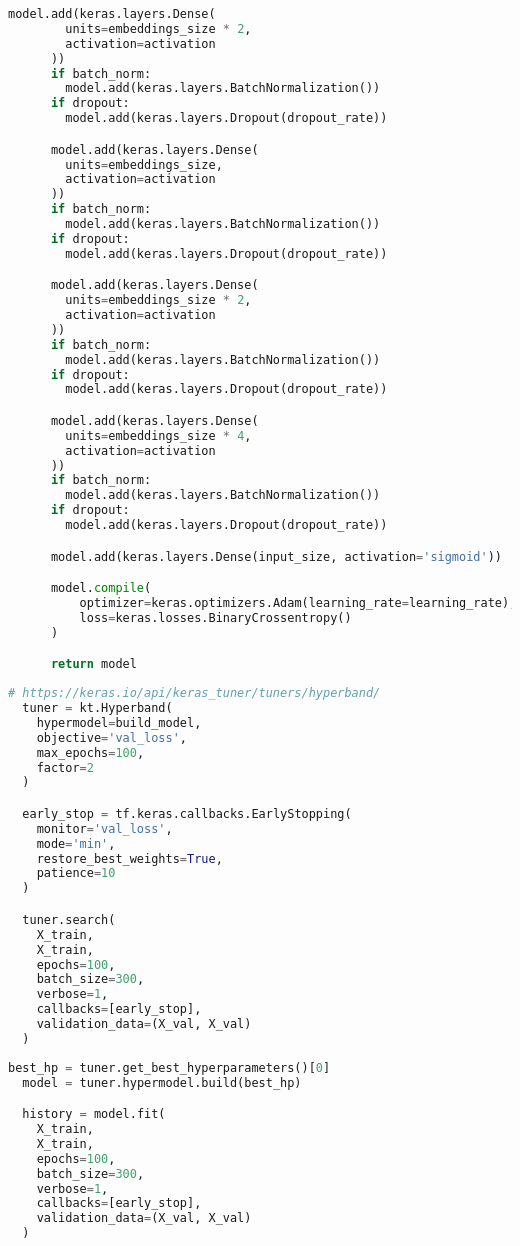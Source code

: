 \begin{lstlisting}[language=Python, caption=Keras and Keras Tuner snippet for model training and hyperparameter tuning]
      model.add(keras.layers.Dense(
        units=embeddings_size * 2,
        activation=activation
      ))
      if batch_norm:
        model.add(keras.layers.BatchNormalization())
      if dropout:
        model.add(keras.layers.Dropout(dropout_rate))

      model.add(keras.layers.Dense(
        units=embeddings_size,
        activation=activation
      ))
      if batch_norm:
        model.add(keras.layers.BatchNormalization())
      if dropout:
        model.add(keras.layers.Dropout(dropout_rate))

      model.add(keras.layers.Dense(
        units=embeddings_size * 2,
        activation=activation
      ))
      if batch_norm:
        model.add(keras.layers.BatchNormalization())
      if dropout:
        model.add(keras.layers.Dropout(dropout_rate))

      model.add(keras.layers.Dense(
        units=embeddings_size * 4,
        activation=activation
      ))
      if batch_norm:
        model.add(keras.layers.BatchNormalization())
      if dropout:
        model.add(keras.layers.Dropout(dropout_rate))

      model.add(keras.layers.Dense(input_size, activation='sigmoid'))

      model.compile(
          optimizer=keras.optimizers.Adam(learning_rate=learning_rate),
          loss=keras.losses.BinaryCrossentropy()
      )

      return model
\end{lstlisting}

\begin{lstlisting}[language=Python, caption=Hyperband search and early stopping setup]
  # https://keras.io/api/keras_tuner/tuners/hyperband/
  tuner = kt.Hyperband(
    hypermodel=build_model,
    objective='val_loss',
    max_epochs=100,
    factor=2
  )

  early_stop = tf.keras.callbacks.EarlyStopping(
    monitor='val_loss',
    mode='min',
    restore_best_weights=True,
    patience=10
  )

  tuner.search(
    X_train,
    X_train,
    epochs=100,
    batch_size=300,
    verbose=1,
    callbacks=[early_stop],
    validation_data=(X_val, X_val)
  )
\end{lstlisting}

\begin{lstlisting}[language=Python, caption=Best model re-training]
  best_hp = tuner.get_best_hyperparameters()[0]
  model = tuner.hypermodel.build(best_hp)

  history = model.fit(
    X_train,
    X_train,
    epochs=100,
    batch_size=300,
    verbose=1,
    callbacks=[early_stop],
    validation_data=(X_val, X_val)
  )
\end{lstlisting}

